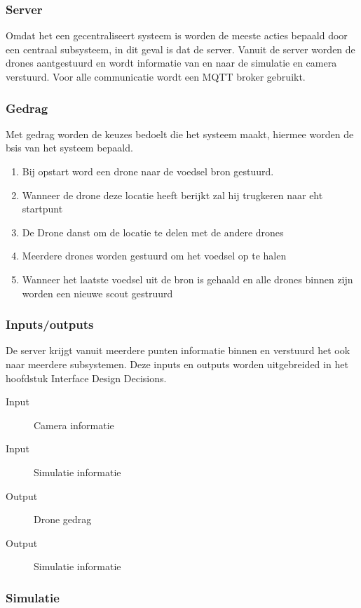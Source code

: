 \subsubsection{Server}
Omdat het een gecentraliseert systeem is worden de meeste acties bepaald door een centraal subsysteem, in dit geval is dat de server.
Vanuit de server worden de drones aantgestuurd en wordt informatie van en naar de simulatie en camera verstuurd. Voor alle communicatie
wordt een MQTT broker gebruikt. 

\subsubsection*{Gedrag}
Met gedrag worden de keuzes bedoelt die het systeem maakt, hiermee worden de bsis van het systeem bepaald.
\begin{enumerate}
    \item Bij opstart word een drone naar de voedsel bron gestuurd.
    \item Wanneer de drone deze locatie heeft berijkt zal hij trugkeren naar eht startpunt
    \item De Drone danst om de locatie te delen met de andere drones
    \item Meerdere drones worden gestuurd om het voedsel op te halen
    \item Wanneer het laatste voedsel uit de bron is gehaald en alle drones binnen zijn worden een nieuwe scout gestruurd
\end{enumerate}

\subsubsection*{Inputs/outputs}
De server krijgt vanuit meerdere punten informatie binnen en verstuurd het ook naar meerdere subsystemen.
Deze inputs en outputs worden uitgebreided in het hoofdstuk Interface Design Decisions.


\begin{description}
    \item[Input] Camera informatie
    \item[Input] Simulatie informatie 
    \item[Output] Drone gedrag
    \item[Output] Simulatie informatie 
\end{description}


\newpage

\subsubsection{Simulatie}



